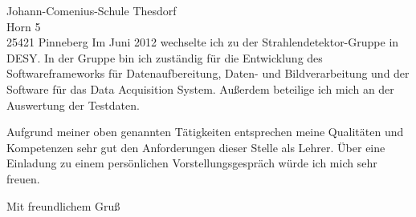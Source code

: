 \documentclass[ebner,paper=a4,fontsize=11pt,ngerman,BCOR=10mm]{scrlttr2}%
\begin{document}
\begin{letter}{Johann-Comenius-Schule Thesdorf\\
Horn 5\\ 
25421 Pinneberg }
Im Juni 2012 wechselte ich zu der Strahlendetektor-Gruppe in DESY. In der Gruppe
bin ich zust{\"a}ndig f{\"u}r die Entwicklung des Softwareframeworks f{\"u}r Datenaufbereitung,
Daten- und Bildverarbeitung und der Software f{\"u}r das Data Acquisition System.
Au{\ss}erdem beteilige ich mich an der Auswertung der Testdaten.

Aufgrund meiner oben genannten T{\"a}tigkeiten entsprechen meine Qualit{\"a}ten und
Kompetenzen sehr gut den Anforderungen dieser Stelle als Lehrer. 
{\"U}ber eine Einladung zu einem pers{\"o}nlichen Vorstellungsgespr{\"a}ch w{\"u}rde ich mich sehr freuen.


\closing{Mit freundlichem Gru\ss}
\enlargethispage{6\baselineskip}

\end{letter}
\end{document}
